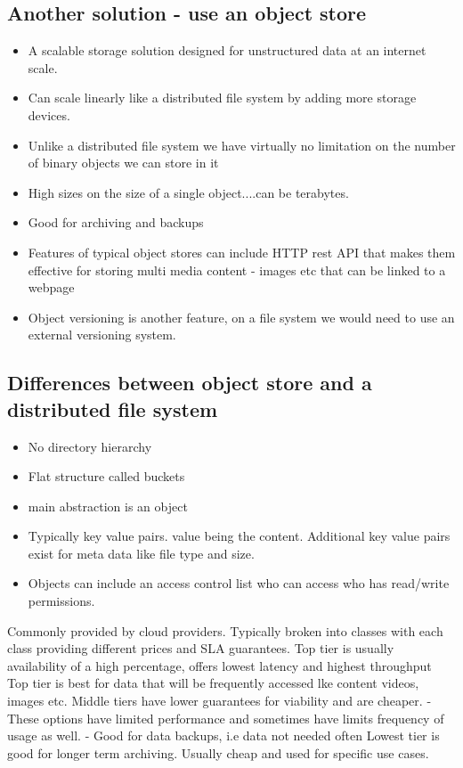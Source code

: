 \documentclass[a4paper, 11pt]{book}
\begin{document}
    \subsection{Another solution - use an object store}
    \begin{itemize}
        \item A scalable storage solution designed for unstructured data at an internet scale.
        \item Can scale linearly like a distributed file system by adding more storage devices.
        \item Unlike a distributed file system we have virtually no limitation on the number of binary objects we can store in it
        \item High sizes on the size of a single object....can be terabytes.
        \item Good for archiving and backups
        \item Features of typical object stores can include HTTP rest API that makes them effective for storing multi media content - images etc that can be linked to a webpage
        \item Object versioning is another feature, on a file system we would need to use an external versioning system.
    \end{itemize}

    \subsection{Differences between object store and a distributed file system}
    \begin{itemize}
        \item No directory hierarchy
        \item Flat structure called buckets
        \item main abstraction is an object
        \item Typically key value pairs. value being the content. Additional key value pairs exist for meta data like file type and size.
        \item Objects can include an access control list who can access who has read/write permissions.
    \end{itemize}

    Commonly provided by cloud providers.
    Typically broken into classes with each class providing different prices and SLA guarantees.
    Top tier is usually availability of a high percentage, offers lowest latency and highest throughput
    Top tier is best for data that will be frequently accessed lke content videos, images etc.
    Middle tiers have lower guarantees for viability and are cheaper.
    - These options have limited performance and sometimes have limits frequency of usage as well.
    - Good for data backups, i.e data not needed often
    Lowest tier is good for longer term archiving.
    Usually cheap and used for specific use cases.
\end{document}
